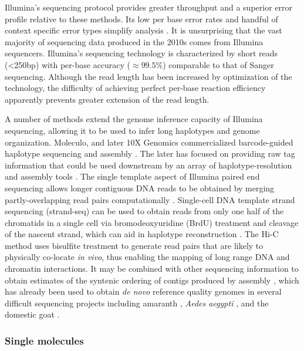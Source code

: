 Illumina's sequencing protocol provides greater throughput and a superior error profile relative to these methods.
Its low per base error rates and handful of context specific error types simplify analysis \cite{allhoff2013discovering}.
It is unsurprising that the vast majority of sequencing data produced in the 2010s comes from Illumina sequencers.
Illumina's sequencing technology is characterized by short reads (<250bp) with per-base accuracy ($\approx 99.5\%$) comparable to that of Sanger sequencing.
Although the read length has been increased by optimization of the technology, the difficulty of achieving perfect per-base reaction efficiency apparently prevents greater extension of the read length.

A number of methods extend the genome inference capacity of Illumina sequencing, allowing it to be used to infer long haplotypes and genome organization.
Moleculo, and later 10X Genomics commercialized barcode-guided haplotype sequencing and assembly \cite{zheng2016haplotyping}.
The later has focused on providing raw tag information that could be used downstream by an array of haplotype-resolution and assembly tools \cite{mostovoy2016hybrid}.
The single template aspect of Illumina paired end sequencing allows longer contiguous DNA reads to be obtained by merging partly-overlapping read pairs computationally \cite{magovc2011flash}.
Single-cell DNA template strand sequencing (strand-seq) can be used to obtain reads from only one half of the chromatids in a single cell \cite{falconer2012dna} via bromodeoxyuridine (BrdU) treatment and cleavage of the nascent strand, which can aid in haplotype reconstruction \cite{porubsky2016direct}.
The Hi-C method \cite{lieberman2009comprehensive} uses bisulfite treatment to generate read pairs that are likely to physically co-locate \emph{in vivo}, thus enabling the mapping of long range DNA and chromatin interactions.
It may be combined with other sequencing information to obtain estimates of the syntenic ordering of contigs produced by assembly \cite{ghurye2018integrating}, which has already been used to obtain \emph{de novo} reference quality genomes in several difficult sequencing projects including amaranth \cite{lightfoot2017single}, \emph{Aedes aegypti} \cite{dudchenko2017novo}, and the domestic goat \cite{bickhart2017single}.

\subsubsection{Single molecules}


